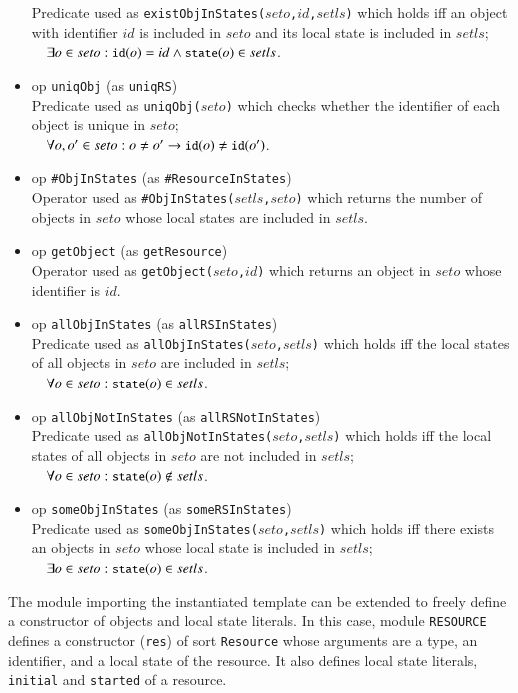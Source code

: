 \documentclass[12pt]{report}
\newcommand{\ra}{\rightarrow}
\newcommand{\mbstt}[1]{\mbox{\small{\tt {#1}}}}
\newcommand{\stt}[1]{{\small{\tt {#1}}}}
\begin{document}
\begin{itemize}
  Predicate used as \stt{existObjInStates($seto$,$id$,$setls$)} which
  holds iff an object with identifier $id$ is included in $seto$ and
  its local state is included in $setls$;\\$~~~~\exists o\in seto:
  \mbstt{id}(o)=id \land \mbstt{state}(o)\in setls$.
\item op \stt{uniqObj} (as \stt{uniqRS})\\
  Predicate used as \stt{uniqObj($seto$)} which checks whether the
  identifier of each object is unique in $seto$;\\$~~~~\forall o,o'\in
  seto: o\ne o'\ra\mbstt{id}(o)\ne\mbstt{id}(o')$.
\item op \stt{\#ObjInStates} (as \stt{\#ResourceInStates})\\ 
  Operator used as \stt{\#ObjInStates($setls$,$seto$)} which returns
  the number of objects in $seto$ whose local states are
  included in $setls$.
\item op \stt{getObject} (as \stt{getResource})\\ 
  Operator used as \stt{getObject($seto$,$id$)} which returns an
  object in $seto$ whose identifier is $id$.
\item op \stt{allObjInStates} (as \stt{allRSInStates})\\
  Predicate used as \stt{allObjInStates($seto$,$setls$)} which holds iff
  the local states of all objects in $seto$ are included
  in $setls$;\\$~~~~\forall o\in seto:\mbstt{state}(o)\in setls$.
\item op \stt{allObjNotInStates} (as \stt{allRSNotInStates})\\
  Predicate used as \stt{allObjNotInStates($seto$,$setls$)} which holds iff
  the local states of all objects in $seto$ are not included
  in $setls$;\\$~~~~\forall o\in seto:\mbstt{state}(o)\not\in setls$.
\item op \stt{someObjInStates} (as \stt{someRSInStates})\\ 
  Predicate used as \stt{someObjInStates($seto$,$setls$)} which holds
  iff there exists an objects in $seto$ whose local state is included
  in $setls$;\\$~~~~\exists o\in seto:\mbstt{state}(o)\in setls$.

\end{itemize}

The module importing the instantiated template can be extended to
freely define a constructor of objects and local state literals.  In
this case, module {\tt RESOURCE} defines a constructor ({\tt res}) of
sort {\tt Resource} whose arguments are a type, an identifier, and a
local state of the resource. It also defines local state literals,
{\tt initial} and {\tt started} of a resource.
\end{document}
